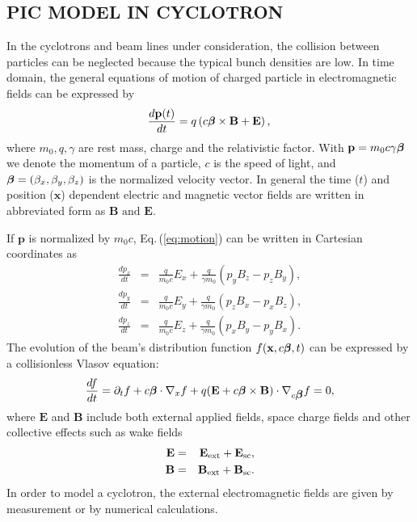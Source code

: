 \documentclass[aps,prstab,onecolumn,superscriptaddress,showpacs]{revtex4}
\newcommand{\bs}[1]{\mathbf #1}
\begin{document}
\subsection{PIC MODEL IN CYCLOTRON}
In the cyclotrons and beam lines under consideration, the collision between particles can be neglected because the typical bunch densities are low.
In time domain, the general equations of motion of charged particle in electromagnetic fields can be expressed by
\begin{equation}\label{eq:motion}
  \frac{d\bs{p}(t)}{dt}  = q\left(c\mbox{\boldmath$\beta$}\times \bs{B} + \bs{E}\right), \nonumber \\
\end{equation}
where $m_0, q,\gamma$ are rest mass, charge and the relativistic factor. With $\bs{p}=m_0 c \gamma \mbox{\boldmath$\beta$}$ we denote the momentum of a particle, 
$c$ is the speed of light, and $\mbox{\boldmath$\beta$}=(\beta_x, \beta_y, \beta_z)$ is the normalized velocity vector. In general the time ($t$) and position ($\bs{x}$) dependent electric and magnetic vector fields are
written in abbreviated form as $\bs{B} \text{ and } \bs{E}$.

If $\bs{p}$ is normalized by $m_0c$, 
Eq.\,(\ref{eq:motion}) can be written in Cartesian coordinates as 
\begin{eqnarray}\label{eq:motion2}
  \frac{dp_x}{dt} & = & \frac{q}{m_0c}E_x + \frac{q}{\gamma m_0}(p_y B_z - p_z B_y),    \nonumber \\
  \frac{dp_y}{dt} & = & \frac{q}{m_0c}E_y + \frac{q}{\gamma m_0}(p_z B_x - p_x B_z),   \\
  \frac{dp_z}{dt} & = & \frac{q}{m_0c}E_z + \frac{q}{\gamma m_0}(p_x B_y - p_y B_x).    \nonumber 
\end{eqnarray}
The evolution of the beam's distribution function $ f(\bs {x},c\mbox{\boldmath$\beta$},t)$ can be expressed by a collisionless Vlasov equation:
\begin{equation}\label{eq:Vlasov}
  \frac{df}{dt}=\partial_t f + c\mbox{\boldmath$\beta$} \cdot \nabla_x f +q(\bs{E}+ c\mbox{\boldmath$\beta$}\times\bs{B})\cdot \nabla_{c\mbox{\boldmath$\beta$}} f  =  0, 
\end{equation}
where $\bs{E}$ and $\bs{B}$ include both external applied fields, space charge fields and other collective effects such as wake fields
\begin{eqnarray}\label{eq:Allfield}
  \bs{E} & = & \bs{E_{\RM{ext}}}+\bs{E_{\RM{sc}}}, \nonumber\\    
  \bs{B} & = & \bs{B_{\RM{ext}}}+\bs{B_{\RM{sc}}}.
\end{eqnarray}
In order to model a cyclotron, the external electromagnetic fields are given by measurement or by numerical calculations. 
\end{document}
